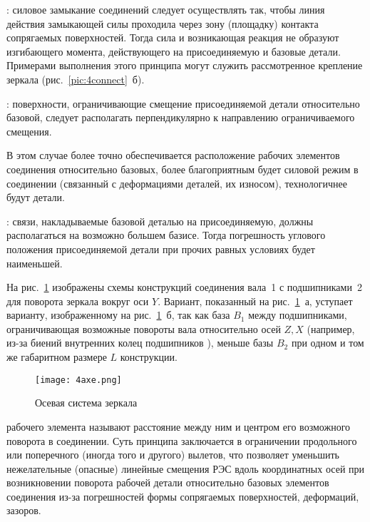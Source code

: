 : силовое замыкание соединений следует осуществлять так, чтобы линия действия замыкающей силы проходила через зону (площадку) контакта сопрягаемых поверхностей. 
Тогда сила и возникающая реакция не образуют изгибающего момента, действующего на присоединяемую и базовые детали. 
Примерами выполнения этого принципа могут служить рассмотренное крепление зеркала (рис.~\ref{pic:4connect}~б).

: поверхности, ограничивающие смещение присоединяемой детали относительно базовой, следует располагать перпендикулярно к направлению ограничиваемого смещения.

В этом случае более точно обеспечивается расположение рабочих элементов соединения относительно базовых, более благоприятным будет силовой режим в соединении (связанный с деформациями деталей, их износом), технологичнее будут детали.

: связи, накладываемые базовой деталью на присоединяемую, должны располагаться на возможно большем базисе. 
Тогда погрешность углового положения присоединяемой детали при прочих равных условиях будет наименьшей.

На рис.~\ref{pic:4axe} изображены схемы конструкций соединения вала~1 с подшипниками~2 для поворота зеркала вокруг оси $ Y $. Вариант, показанный на рис.~\ref{pic:4axe}~а, уступает варианту, изображенному на рис.~\ref{pic:4axe}~б, так как база $ B_1 $ между подшипниками, ограничивающая возможные повороты вала относительно осей $ Z, X $ (например, из-за биений   внутренних колец подшипников  ), меньше базы $ B_2 $ при одном и том же габаритном размере $ L $ конструкции.

\begin{figure}[h!]
	\begin{center}
		\caption{Осевая система зеркала}
		\texttt{[image: 4axe.png]}
		\label{pic:4axe}
	\end{center}
\end{figure}

 рабочего элемента называют расстояние между ним и центром его возможного поворота в соединении. 
Суть принципа заключается в ограничении продольного или поперечного (иногда того и другого) вылетов, что позволяет уменьшить нежелательные (опасные) линейные смещения РЭС вдоль координатных осей при возникновении поворота рабочей детали относительно базовых элементов соединения из-за погрешностей формы сопрягаемых поверхностей, деформаций, зазоров.

